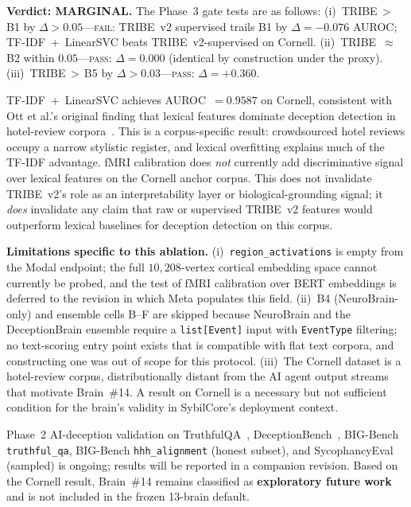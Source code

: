 \documentclass{article}
\begin{document}
\textbf{Verdict: MARGINAL.} The Phase~3 gate tests are as follows:
(i)~TRIBE\,$>$\,B1 by $\Delta > 0.05$---\textsc{fail}: TRIBE~v2
supervised trails B1 by $\Delta = -0.076$ AUROC; TF-IDF~+~LinearSVC
beats TRIBE~v2-supervised on Cornell.
(ii)~TRIBE~$\approx$\,B2 within $0.05$---\textsc{pass}: $\Delta = 0.000$
(identical by construction under the proxy).
(iii)~TRIBE\,$>$\,B5 by $\Delta > 0.03$---\textsc{pass}: $\Delta = +0.360$.

TF-IDF~+~LinearSVC achieves AUROC~$= 0.9587$ on Cornell, consistent
with Ott et al.'s original finding that lexical
features dominate deception detection in hotel-review
corpora~\cite{ott2011finding}. This is a corpus-specific result:
crowdsourced hotel reviews occupy a narrow stylistic register, and
lexical overfitting explains much of the TF-IDF advantage. fMRI
calibration does \emph{not} currently add discriminative signal over
lexical features on the Cornell anchor corpus. This does not
invalidate TRIBE~v2's role as an interpretability layer or
biological-grounding signal; it \emph{does} invalidate any claim that
raw or supervised TRIBE~v2 features would outperform lexical baselines
for deception detection on this corpus.

\textbf{Limitations specific to this ablation.}
(i)~\texttt{region\_activations} is empty from the Modal endpoint;
the full $10{,}208$-vertex cortical embedding space cannot currently
be probed, and the test of fMRI calibration over BERT embeddings is
deferred to the revision in which Meta populates this field.
(ii)~B4 (NeuroBrain-only) and ensemble cells B--F are skipped because
NeuroBrain and the DeceptionBrain ensemble require a
\texttt{list[Event]} input with \texttt{EventType} filtering; no
text-scoring entry point exists that is compatible with flat text
corpora, and constructing one was out of scope for this protocol.
(iii)~The Cornell dataset is a hotel-review corpus, distributionally
distant from the AI agent output streams that motivate Brain~\#14.
A result on Cornell is a necessary but not sufficient condition for
the brain's validity in SybilCore's deployment context.

Phase~2 AI-deception validation on TruthfulQA~\cite{lin2022truthfulqa},
DeceptionBench~\cite{pacchiardi2023llm}, BIG-Bench \texttt{truthful\_qa},
BIG-Bench \texttt{hhh\_alignment} (honest subset), and SycophancyEval
(sampled) is ongoing; results will be reported in a companion revision.
Based on the Cornell result, Brain~\#14 remains classified as
\textbf{exploratory future work} and is not included in the frozen
13-brain default.
\end{document}
